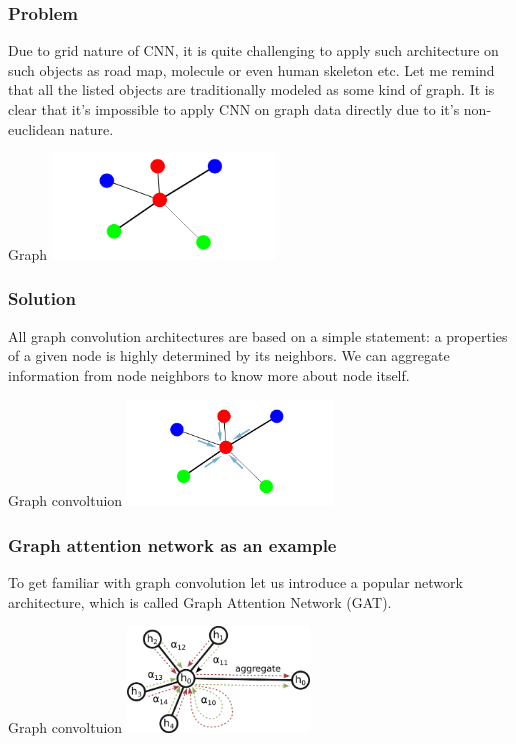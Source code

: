 \documentclass[10pt]{beamer}
\begin{document}
\begin{frame}
    \frametitle{Problem}
    Due to grid nature of CNN, it is quite challenging to apply such architecture on such objects as road map, molecule or even human skeleton etc. Let me remind that all the listed objects are traditionally modeled as some kind of graph. It is clear that it's impossible to apply CNN on graph data directly due to it's non-euclidean nature.
    \begin{block}{Graph}
        \centering
        \includegraphics[height=80pt]{figure/graph.png}
    \end{block}
\end{frame}

\begin{frame}
    \frametitle{Solution}
    All graph convolution architectures are based on a simple statement: a properties of a given node is highly determined by its neighbors. We can aggregate information from node neighbors to know more about node itself.
    \begin{block}{Graph convoltuion}
        \centering
        \includegraphics[height=80pt]{figure/graph-spatial-convolution.png}
    \end{block}
\end{frame}

\begin{frame}
    \frametitle{Graph attention network as an example}
    To get familiar with graph convolution let us introduce a popular network architecture, which is called Graph Attention Network (GAT).
    \begin{block}{Graph convoltuion}
        \centering
        \includegraphics[height=80pt]{figure/attention.png}
    \end{block}
\end{frame}
\end{document}
